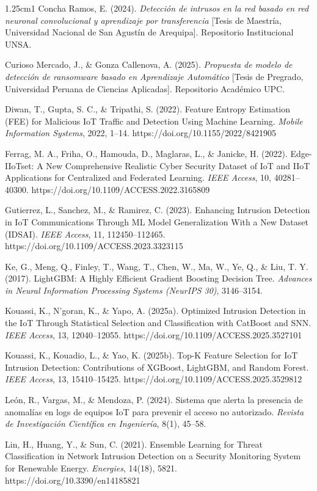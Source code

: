 \begin{hangparas}{1.25cm}{1}
Concha Ramos, E. (2024). \textit{Detección de intrusos en la red basado en red neuronal convolucional y aprendizaje por transferencia} [Tesis de Maestría, Universidad Nacional de San Agustín de Arequipa]. Repositorio Institucional UNSA.

Curioso Mercado, J., \& Gonza Callenova, A. (2025). \textit{Propuesta de modelo de detección de ransomware basado en Aprendizaje Automático} [Tesis de Pregrado, Universidad Peruana de Ciencias Aplicadas]. Repositorio Académico UPC.

Diwan, T., Gupta, S. C., \& Tripathi, S. (2022). Feature Entropy Estimation (FEE) for Malicious IoT Traffic and Detection Using Machine Learning. \textit{Mobile Information Systems}, 2022, 1--14. https://doi.org/10.1155/2022/8421905

Ferrag, M. A., Friha, O., Hamouda, D., Maglaras, L., \& Janicke, H. (2022). Edge-IIoTset: A New Comprehensive Realistic Cyber Security Dataset of IoT and IIoT Applications for Centralized and Federated Learning. \textit{IEEE Access}, 10, 40281--40300. https://doi.org/10.1109/ACCESS.2022.3165809

Gutierrez, L., Sanchez, M., \& Ramirez, C. (2023). Enhancing Intrusion Detection in IoT Communications Through ML Model Generalization With a New Dataset (IDSAI). \textit{IEEE Access}, 11, 112450--112465. https://doi.org/10.1109/ACCESS.2023.3323115

Ke, G., Meng, Q., Finley, T., Wang, T., Chen, W., Ma, W., Ye, Q., \& Liu, T. Y. (2017). LightGBM: A Highly Efficient Gradient Boosting Decision Tree. \textit{Advances in Neural Information Processing Systems (NeurIPS 30)}, 3146--3154.

Kouassi, K., N'goran, K., \& Yapo, A. (2025a). Optimized Intrusion Detection in the IoT Through Statistical Selection and Classification with CatBoost and SNN. \textit{IEEE Access}, 13, 12040--12055. https://doi.org/10.1109/ACCESS.2025.3527101

Kouassi, K., Kouadio, L., \& Yao, K. (2025b). Top-K Feature Selection for IoT Intrusion Detection: Contributions of XGBoost, LightGBM, and Random Forest. \textit{IEEE Access}, 13, 15410--15425. https://doi.org/10.1109/ACCESS.2025.3529812

León, R., Vargas, M., \& Mendoza, P. (2024). Sistema que alerta la presencia de anomalías en logs de equipos IoT para prevenir el acceso no autorizado. \textit{Revista de Investigación Científica en Ingeniería}, 8(1), 45--58.

Lin, H., Huang, Y., \& Sun, C. (2021). Ensemble Learning for Threat Classification in Network Intrusion Detection on a Security Monitoring System for Renewable Energy. \textit{Energies}, 14(18), 5821. https://doi.org/10.3390/en14185821


\end{hangparas}
